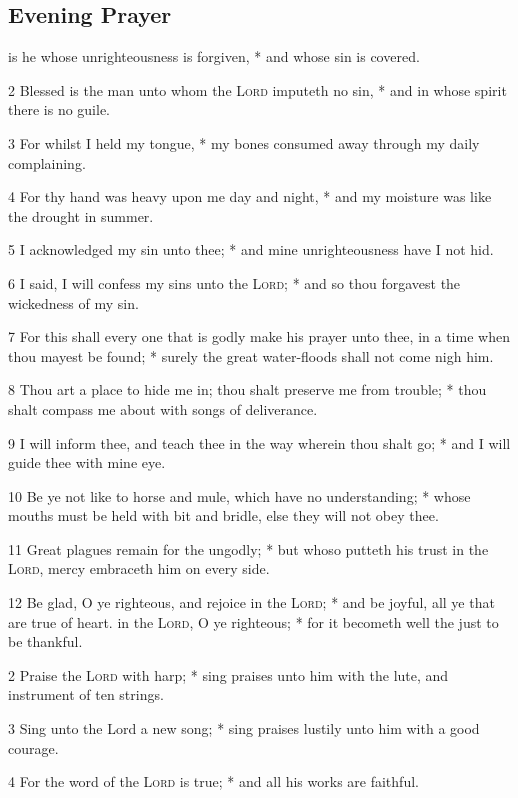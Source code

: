 \subsection{Evening Prayer}
 is he whose unrighteousness is forgiven, * and whose sin is covered.\par
2 Blessed is the man unto whom the {\textsc{Lord}} imputeth no sin, * and in whose spirit there is no guile.\par
3 For whilst I held my tongue, * my bones consumed away through my daily complaining.\par
4 For thy hand was heavy upon me day and night, * and my moisture was like the drought in summer.\par
5 I acknowledged my sin unto thee; * and mine unrighteousness have I not hid.\par
6 I said, I will confess my sins unto the {\textsc{Lord}}; * and so thou forgavest the wickedness of my sin.\par
7 For this shall every one that is godly make his prayer unto thee, in a time when thou mayest be found; * surely the great water-floods shall not come nigh him.\par
8 Thou art a place to hide me in; thou shalt preserve me from trouble; * thou shalt compass me about with songs of deliverance.\par
9 I will inform thee, and teach thee in the way wherein thou shalt go; * and I will guide thee with mine eye.\par
10 Be ye not like to horse and mule, which have no understanding; * whose mouths must be held with bit and bridle, else they will not obey thee.\par
11 Great plagues remain for the ungodly; * but whoso putteth his trust in the {\textsc{Lord}}, mercy embraceth him on every side.\par
12 Be glad, O ye righteous, and rejoice in the {\textsc{Lord}}; * and be joyful, all ye that are true of heart.
 in the {\textsc{Lord}}, O ye righteous; * for it becometh well the just to be thankful.\par
2 Praise the {\textsc{Lord}} with harp; * sing praises unto him with the lute, and instrument of ten strings.\par
3 Sing unto the Lord a new song; * sing praises lustily unto him with a good courage.\par
4 For the word of the {\textsc{Lord}} is true; * and all his works are faithful.\par
